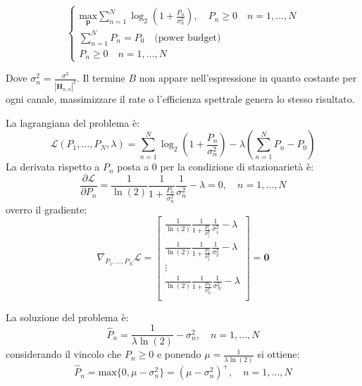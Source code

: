 \[
    \begin{cases}
       \underset{\mathbf{p}}{\text{max}} \sum_{n=1}^{N} \log_2(1 + \frac{P_n}{\sigma_n^2}), \quad P_n \geq 0 \quad n = 1, \ldots, N \\
       \sum_{n=1}^{N} P_n = P_0 \quad \text{(power budget)} \\
        P_n \geq 0 \quad n = 1, \ldots, N
    \end{cases}    
\]

Dove $\sigma_n^2 = \frac{\sigma^2}{\left| \mathbf{H}_{n, n} \right| ^2}$. Il termine $B$ non appare nell'espressione in quanto costante per ogni canale, massimizzare il rate o l'efficienza spettrale genera lo stesso risultato.

La lagrangiana del problema è:
\[
    \mathcal{L}(P_1, \hdots, P_N, \lambda ) = \sum_{n=1}^{N} \log_2(1 + \frac{P_n}{\sigma_n^2}) - \lambda \left( \sum_{n=1}^{N} P_n - P_0 \right)
\]
La derivata rispetto a $P_n$ posta a 0 per la condizione di stazionarietà è:
\[
    \frac{\partial \mathcal{L}}{\partial P_n} = \frac{1}{\ln(2)} \frac{1}{1 + \frac{P_n}{\sigma_n^2}} \frac{1}{\sigma_n^2} - \lambda = 0, \quad n = 1, \ldots, N
\]
overro il gradiente:
\[
    \nabla_{P_1, \hdots, P_N} \mathcal{L} = \begin{bmatrix}
        \frac{1}{\ln(2)} \frac{1}{1 + \frac{P_1}{\sigma_1^2}} \frac{1}{\sigma_1^2} - \lambda \\
        \frac{1}{\ln(2)} \frac{1}{1 + \frac{P_2}{\sigma_2^2}} \frac{1}{\sigma_2^2} - \lambda \\
        \vdots \\
        \frac{1}{\ln(2)} \frac{1}{1 + \frac{P_N}{\sigma_N^2}} \frac{1}{\sigma_N^2} - \lambda \\
\end{bmatrix} = \mathbf{0}
\]

La soluzione del problema è:
\[
    \hat{P}_n = \frac{1}{\lambda \ln(2)} - \sigma_n^2, \quad n = 1, \ldots, N
\]
considerando il vincolo che $P_n \geq 0$ e ponendo $\mu = \frac{1}{\lambda \ln(2)}$ si ottiene:
\[
    \hat{P}_n = \text{max} \{ 0, \mu - \sigma_n^2    \} = (\mu - \sigma_n^2)^+, \quad n = 1, \ldots, N
\]

